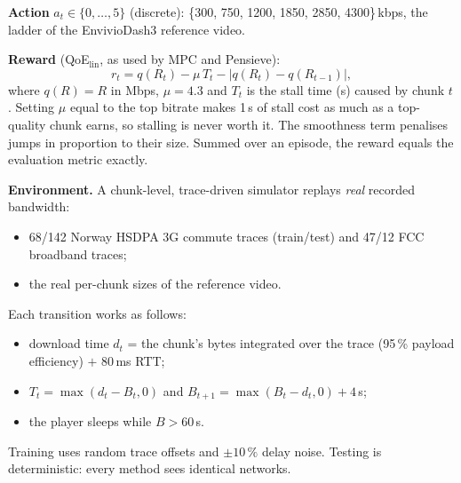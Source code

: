 \documentclass[10pt,twocolumn]{article}
\begin{document}
\textbf{Action} $a_t\in\{0,\dots,5\}$ (discrete): \{300, 750, 1200, 1850, 2850, 4300\}\,kbps, the ladder
of the EnvivioDash3 reference video.

\textbf{Reward} (QoE$_{\text{lin}}$, as used by MPC and Pensieve):
\begin{equation}
r_t = q(R_t) - \mu\,T_t - \lvert q(R_t)-q(R_{t-1})\rvert ,
\end{equation}
where $q(R)=R$ in Mbps, $\mu=4.3$ and $T_t$ is the stall time (s) caused by chunk $t$. Setting $\mu$ equal to the top bitrate makes 1\,s of
stall cost as much as a top-quality chunk earns, so stalling is never worth it. The smoothness term
penalises jumps in proportion to their size. Summed over an episode, the reward equals the evaluation
metric exactly.

\textbf{Environment.} A chunk-level, trace-driven simulator replays \emph{real} recorded bandwidth:
\begin{itemize}
  \item 68/142 Norway HSDPA 3G commute traces (train/test) and 47/12 FCC broadband traces;
  \item the real per-chunk sizes of the reference video.
\end{itemize}
Each transition works as follows:
\begin{itemize}
  \item download time $d_t$ = the chunk's bytes integrated over the trace (95\,\% payload efficiency)
    $+$ 80\,ms RTT;
  \item $T_t=\max(d_t-B_t,0)$ and $B_{t+1}=\max(B_t-d_t,0)+4$\,s;
  \item the player sleeps while $B>60$\,s.
\end{itemize}
Training uses random trace offsets and $\pm10\,\%$ delay noise. Testing is deterministic: every method
sees identical networks.
\end{document}
